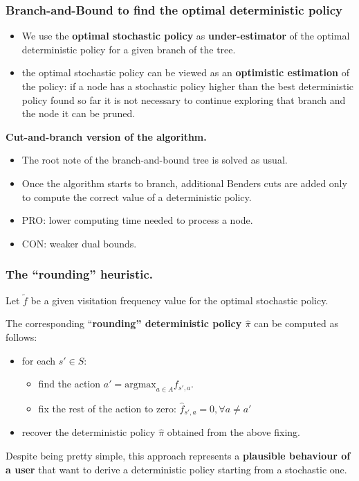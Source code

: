 \documentclass{beamer}
\begin{document}
\begin{frame}
\frametitle{Branch-and-Bound to find the optimal deterministic policy}
\begin{itemize}
\item We use the \textbf{optimal stochastic policy} as \textbf{under-estimator} of the optimal deterministic policy for a given branch of the tree.
\item the optimal stochastic policy can be viewed as an \textbf{optimistic estimation} of the policy: if a node has a stochastic policy higher than the best deterministic policy found so far it is not necessary to continue exploring that branch and the node it can be pruned.
\end{itemize}

\begin{block}{\textbf{Cut-and-branch version of the algorithm.}}

\begin{itemize}
\item  The root note of the branch-and-bound tree is solved as usual. %
\item Once the algorithm starts to branch, additional Benders cuts are added only to compute the correct value of a deterministic policy.
\item PRO: lower computing time needed to process a node.
\item CON: weaker dual bounds.
\end{itemize}
\end{block}

\end{frame}


\begin{frame}
\frametitle{The ``rounding'' heuristic.}

Let $\tilde{f}$ be a given visitation frequency value for the optimal stochastic policy. 

The corresponding ``\textbf{rounding'' deterministic policy $\hat{\pi}$} can be computed as follows:

\begin{itemize}
\item for each $s'\in S$:
\begin{itemize}
\item find the action $a' = \text{argmax}_{a \in A}f_{s',a}$.
\item fix the rest of the action to zero: $\hat{f}_{s',a} =0, \forall a \neq a'$
\end{itemize}
\item recover the deterministic policy $\hat{\pi}$ obtained from the above fixing.
\end{itemize} 
 
Despite being pretty simple, this approach represents a \textbf{plausible behaviour of a user} that want to derive a deterministic policy starting from a stochastic one. 

\end{frame}
\end{document}
